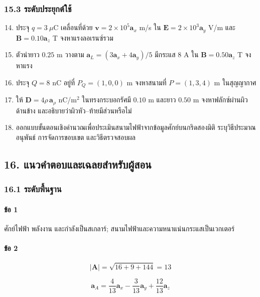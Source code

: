 \subsubsection{15.3 ระดับประยุกต์ใช้}

\begin{enumerate}
\setcounter{enumi}{13}
\item ประจุ \(q=3\ \mu\)C เคลื่อนที่ด้วย \(\mathbf{v}=2\times10^5\mathbf{a}_x\) m/s ใน \(\mathbf{E}=2\times10^3\mathbf{a}_y\) V/m และ \(\mathbf{B}=0.10\mathbf{a}_z\) T จงหาแรงลอเรนซ์รวม
\item ตัวนำยาว \(0.25\) m วางตาม \(\mathbf{a}_L=(3\mathbf{a}_x+4\mathbf{a}_y)/5\) มีกระแส \(8\) A ใน \(\mathbf{B}=0.50\mathbf{a}_z\) T จงหาแรง
\item ประจุ \(Q=8\) nC อยู่ที่ \(P_Q=(1,0,0)\) m จงหาสนามที่ \(P=(1,3,4)\) m ในสุญญากาศ
\item ให้ \(\mathbf{D}=4\rho\,\mathbf{a}_\rho\) nC/m\(^2\) ในทรงกระบอกรัศมี \(0.10\) m และยาว \(0.50\) m จงหาฟลักซ์ผ่านผิวด้านข้าง และอธิบายว่าผิวหัว--ท้ายมีส่วนหรือไม่
\item ออกแบบขั้นตอนเชิงคำนวณเพื่อประเมินสนามไฟฟ้าจากข้อมูลศักย์บนกริดสองมิติ ระบุวิธีประมาณอนุพันธ์ การจัดการขอบเขต และวิธีตรวจสอบผล
\end{enumerate}

\subsection{16. แนวคำตอบและเฉลยสำหรับผู้สอน}

\subsubsection{16.1 ระดับพื้นฐาน}

\paragraph{ข้อ 1}

ศักย์ไฟฟ้า พลังงาน และกำลังเป็นสเกลาร์; สนามไฟฟ้าและความหนาแน่นกระแสเป็นเวกเตอร์

\paragraph{ข้อ 2}

\[
|\mathbf{A}|=\sqrt{16+9+144}=13
\]

\[
\boxed{\mathbf{a}_A=\frac{4}{13}\mathbf{a}_x-\frac{3}{13}\mathbf{a}_y+\frac{12}{13}\mathbf{a}_z}
\]

